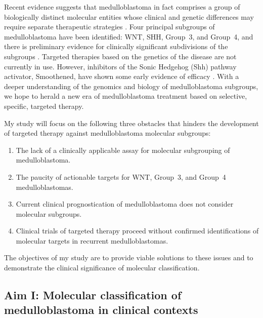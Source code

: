\documentclass[11pt,letterpaper]{article}
\theoremstyle{definition}
\begin{document}
Recent evidence suggests that medulloblastoma in fact comprises a group of biologically distinct molecular entities whose clinical and genetic differences may require separate therapeutic strategies . Four principal subgroups of medulloblastoma have been identified: WNT, SHH, Group~3, and Group~4, and there is preliminary evidence for clinically significant subdivisions of the subgroups . Targeted therapies based on the genetics of the disease are not currently in use. However, inhibitors of the Sonic Hedgehog (Shh) pathway activator, Smoothened, have shown some early evidence of efficacy . With a deeper understanding of the genomics and biology of medulloblastoma subgroups, we hope to herald a new era of medulloblastoma treatment based on selective, specific, targeted therapy.

My study will focus on the following three obstacles that hinders the development of targeted therapy against medulloblastoma molecular subgroups:

\begin{enumerate}
	\item The lack of a clinically applicable assay for molecular subgrouping of medulloblastoma.
	\item The paucity of actionable targets for WNT, Group~3, and Group~4 medulloblastomas.
	\item Current clinical prognostication of medulloblastoma does not consider molecular subgroups.
	\item Clinical trials of targeted therapy proceed without confirmed identifications of molecular targets in recurrent medulloblastomas.
\end{enumerate}

The objectives of my study are to provide viable solutions to these issues and to demonstrate the clinical significance of molecular classification.

\subsection{Aim I: Molecular classification of medulloblastoma in clinical contexts}
\end{document}
